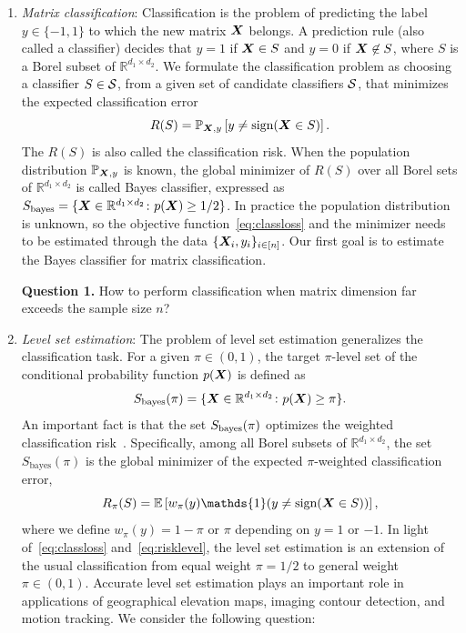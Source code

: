\documentclass[11pt]{article}
\theoremstyle{definition}
\def\sign{\textup{sign}}
\def\bayesS{S_{\textup{bayes}}}
\begin{document}
\begin{enumerate}[label={2.\arabic*},wide, labelwidth=!, labelindent=0pt]
\item {\it Matrix classification}: Classification is the problem of predicting the label $y\in \{-1,1\}$ to which the new matrix $\bm X$ belongs. A prediction rule (also called a classifier) decides that $y=1$ if $\bm X\in S$ and $y=0$ if $\bm X \not\in S$, where $S$ is a Borel subset of $\mathbb{R}^{d_1\times d_2}$. We formulate the classification problem as choosing a classifier $S\in \mathcal{S}$, from a given set of candidate classifiers $\mathcal{S}$, that minimizes the expected classification error 
\begin{equation}\label{eq:classloss}
R(S)=\mathbb{P}_{\mX,y}\left[y\neq \sign(\mX\in S)\right].
\end{equation}
The $R(S)$ is also called the classification risk. When the population distribution $\mathbb{P}_{\bm X,y}$ is known, the global minimizer of $R(S)$ over all Borel sets of $\mathbb{R}^{d_1\times d_2}$ is called Bayes classifier, expressed as $\bayesS=\{\mX\in\mathbb{R}^{d_1\times d_2}\colon p(\mX)\geq 1/2\}$. In practice the population distribution is unknown, so the objective function~\eqref{eq:classloss} and the minimizer needs to be estimated through the data $\{\bm X_i,y_i\}_{i\in[n]}$. Our first goal is to estimate the Bayes classifier for matrix classification. 

{\bf Question 1.} How to perform classification when matrix dimension far exceeds the sample size $n$?

\item {\it Level set estimation}: The problem of level set estimation generalizes the classification task. For a given $\pi\in(0, 1)$, the target $\pi$-level set of the conditional probability function $p(\bm X)$ is defined as
\begin{equation}\label{eq:level}
\bayesS(\pi) = \{\mX\in\mathbb{R}^{d_1\times d_2}\colon p(\mX)\geq \pi\}.
\vspace{-.3cm}
\end{equation}
An important fact is that the set $\bayesS(\pi)$ optimizes the weighted classification risk~\citep{scott2007regression,wang2008probability}. Specifically, among all Borel subsets of $\mathbb{R}^{d_1\times d_2}$, the set $S_{\text{bayes}}(\pi)$ is the global minimizer of the expected $\pi$-weighted classification error,
\begin{equation}\label{eq:risklevel}
R_\pi(S)=\mathbb{E}\left[ w_{\pi}(y)\mathds{1}(y\neq \sign(\mX\in S))\right],
\end{equation}
where we define $w_{\pi}(y)=1-\pi$ or $\pi$ depending on $y=1$ or $-1$. In light of~\eqref{eq:classloss} and~\eqref{eq:risklevel}, the level set estimation is an extension of the usual classification from equal weight $\pi=1/2$ to general weight $\pi \in(0,1)$. Accurate level set estimation plays an important role in applications of geographical elevation maps, imaging contour detection, and motion tracking. We consider the following question:


\end{enumerate}
\end{document}

